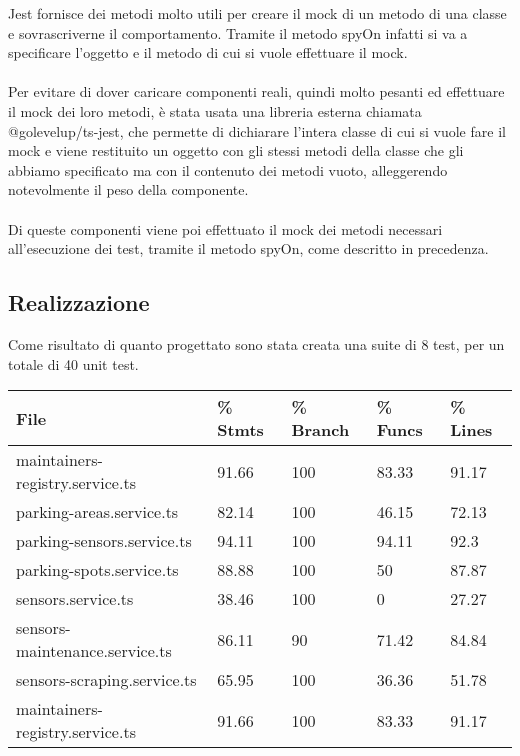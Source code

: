 Jest fornisce dei metodi molto utili per creare il \gls{mock} di un metodo di una classe e sovrascriverne il comportamento.
Tramite il metodo spyOn infatti si va a specificare l'oggetto e il metodo di cui si vuole effettuare il \gls{mock}.
\\\\
Per evitare di dover caricare componenti reali, quindi molto pesanti ed effettuare il \gls{mock} dei loro metodi, è stata
usata una libreria esterna chiamata @golevelup/ts-jest, che permette di dichiarare l'intera classe di cui si vuole fare
il \gls{mock} e viene restituito un oggetto con gli stessi metodi della classe che gli abbiamo specificato ma con il contenuto 
dei metodi vuoto, 
alleggerendo notevolmente il peso della componente.
\\\\
Di queste componenti viene poi effettuato il \gls{mock} dei metodi necessari all'esecuzione dei test, tramite il metodo
spyOn, come descritto in precedenza.
\clearpage
\subsection{Realizzazione}
Come risultato di quanto progettato sono stata creata una suite di 8 test, per un totale di 40 unit test.
\begin{table}[H]
    \begin{tabular}{|p{4.8cm}|p{1.5cm}|p{1.7cm}|p{1.5cm}| p{1.4cm} |} 
    \hline
    \textbf{File} & \textbf{\% Stmts} & \textbf{\% Branch} &  \textbf{\% Funcs} & \textbf{\% Lines} \\ 
    \hline
    maintainers-registry.service.ts & 91.66 & 100 & 83.33 & 91.17 \\ 
    \hline
    parking-areas.service.ts & 82.14 & 100 & 46.15 & 72.13 \\ 
    \hline
    parking-sensors.service.ts & 94.11 & 100 & 94.11 & 92.3 \\ 
    \hline
    parking-spots.service.ts & 88.88 & 100 & 50 & 87.87 \\ 
    \hline
    sensors.service.ts & 38.46 & 100 & 0 & 27.27 \\ 
    \hline
    sensors-maintenance.service.ts & 86.11 & 90 & 71.42 & 84.84 \\ 
    \hline
    sensors-scraping.service.ts & 65.95 & 100 & 36.36 & 51.78 \\ 
    \hline
    maintainers-registry.service.ts & 91.66 & 100 & 83.33 & 91.17 \\ 
    \hline
    \end{tabular}
\end{table}

